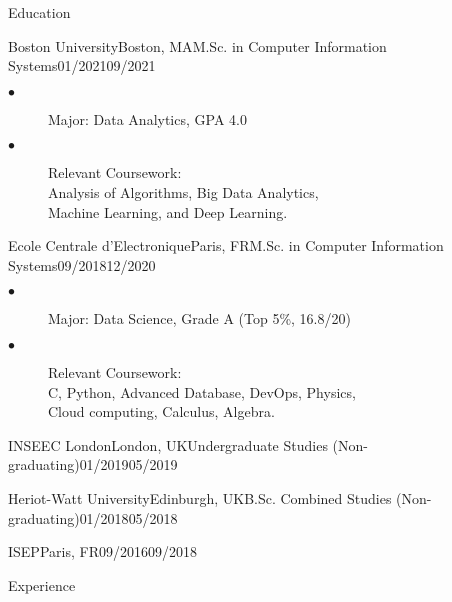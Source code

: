 \documentclass{resume}
\begin{document}
	\begin{multicols}{2}

	\begin{rSection}{\Large Education}
		\begin{school}{Boston University}{Boston, MA}{M.Sc. in Computer Information Systems}{01/2021}{09/2021}{
			\begin{description}
				\item[$\bullet$]Major:  Data Analytics, GPA 4.0
				\item[$\bullet$]{Relevant Coursework: \\
				Analysis of Algorithms, Big Data Analytics, \\
				Machine Learning, and Deep Learning.}
			\end{description}
		}
		\end{school}
		\begin{school}{Ecole Centrale d'Electronique}{Paris, FR}{M.Sc. in Computer Information Systems}{09/2018}{12/2020}{
			\begin{description}
				\item[$\bullet$]Major: Data Science, Grade A  (Top 5\%, 16.8/20)
				\item[$\bullet$]{Relevant Coursework: \\
				C, Python, Advanced Database, DevOps, Physics,\\
				Cloud computing, Calculus, Algebra.
				}
			\end{description}
		}
		\end{school}
		\begin{school}{INSEEC London}{London, UK}{Undergraduate Studies (Non-graduating)}{01/2019}{05/2019}{}
		\end{school}
		\begin{school}{Heriot-Watt University}{Edinburgh, UK}{B.Sc. Combined Studies (Non-graduating)}{01/2018}{05/2018}{}
		\end{school}
            \begin{school}{ISEP}{Paris, FR}{}{09/2016}{09/2018}{}
		\end{school}
	\end{rSection}

	\begin{rSection}{\Large Experience}
	

\end{rSection}
\end{multicols}
\end{document}

